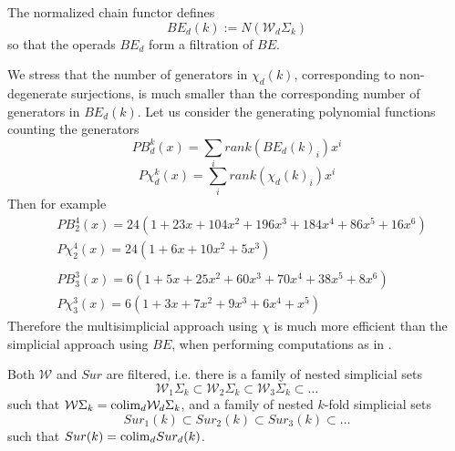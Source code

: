The normalized chain functor defines 
$$BE_d(k):=N(\mathcal{W}_d \Sigma_k)$$ so that the operads $BE_d$  
form a filtration of $BE$.





We stress that the number of generators in $\chi_d(k)$, corresponding to non-degenerate surjections,
is much smaller than the corresponding number of generators in $BE_d(k)$. 
Let us consider the generating polynomial functions counting the generators
$$PB_d^k(x) = \sum_i rank(BE_d(k)_i) x^i $$ $$P\chi_d^k(x)=
\sum_i rank(\chi_d(k)_i) x^i$$   
Then for example 
\begin{align*}
& PB_2^4(x)=24(1+23x+104x^2+196x^3+184x^4+86x^5+16x^6)\\
& P\chi_2^4(x)=24(1+6x+10x^2+5x^3) \\
& \\
& PB_3^3(x) = 6(1+5x+25x^2+60x^3+70x^4+38x^5+8x^6 ) \\
&  P\chi_3^3(x)= 6(1+3x+7x^2+9x^3+6x^4+x^5)
\end{align*} 
Therefore the multisimplicial approach using $\chi$ is much more efficient than the simplicial
approach using $BE$, when performing computations as in \cite{formality}. 



	Both $\mathcal{W}$ and $Sur$ are filtered, i.e.
	there is a family of nested simplicial sets $$\mathcal{W}_1\Sigma_k \subset \mathcal{W}_2 \Sigma_k
	\subset \mathcal{W}_3 \Sigma_k
	\subset \dots $$ such that 
	$\mathcal{W}\Sigma_k={\rm colim}_d \mathcal{W}_d\Sigma_k$, and a family of nested $k$-fold simplicial sets
	$$Sur_1(k) \subset Sur_2(k)  \subset Sur_3(k)  \subset\dots $$ such that $Sur(k) = {\rm colim}_d Sur_d(k)$.
	
